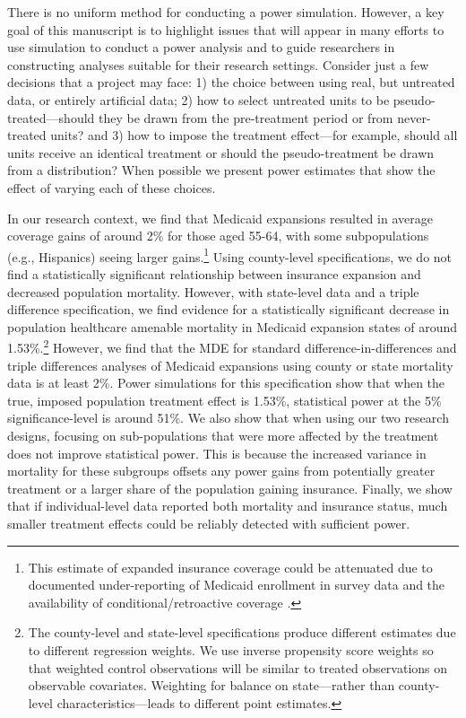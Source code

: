 \documentclass[12pt]{article}%
\begin{document}
There is no uniform method for conducting a power simulation. 
However, a key goal of this manuscript is to highlight issues that will appear in many efforts to use simulation to conduct a power analysis and to guide researchers in constructing analyses suitable for their research settings. 
Consider just a few decisions that a project may face:
1) the choice between using real, but untreated data, or entirely artificial data; 
2) how to select untreated units to be pseudo-treated---should they be drawn from the pre-treatment period or from never-treated units? 
and 3) how to impose the treatment effect---for example, should all units receive an identical treatment or should the pseudo-treatment be drawn from a distribution? 
When possible we present power estimates that show the effect of varying each of these choices.

In our research context, we find that Medicaid expansions resulted in average coverage gains of around 2\% for those aged 55-64, with some subpopulations (e.g., Hispanics) seeing larger gains.\footnote{This estimate of expanded insurance coverage could be attenuated due to documented under-reporting of Medicaid enrollment in survey data and the availability of conditional/retroactive coverage \citep{Davern2009MedicaidUndercountInSurveys,martonHealthInsuranceGenerosity2015}.}
Using county-level specifications, we do not find a statistically significant relationship between insurance expansion and decreased population mortality. 
However, with state-level data and a triple difference specification, we find evidence for a statistically significant decrease in  population healthcare amenable mortality in Medicaid expansion states of around 1.53\%.\footnote{The county-level and state-level specifications produce different estimates due to different regression weights. We use inverse propensity score weights so that weighted control observations will be similar to treated observations on observable covariates. Weighting for balance on state—rather than county-level characteristics—leads to different point estimates.}
However, we find that the MDE for standard difference-in-differences and triple differences analyses of Medicaid expansions using county or state mortality data is  at least 2\%. 
Power simulations for this specification show that when the true, imposed population treatment effect is 1.53\%, statistical power at the 5\% significance-level is around 51\%.
We also show that when using our two research designs, focusing on sub-populations that were more affected by the treatment does not improve statistical power. 
This is because the increased variance in mortality for these subgroups offsets any power gains from potentially greater treatment or a larger share of the population gaining insurance. 
Finally, we show that if individual-level data reported both mortality and insurance status, much smaller treatment effects could be reliably detected with sufficient power.  
\end{document}

